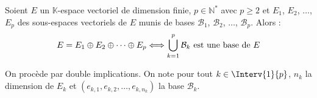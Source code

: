\documentclass[a4paper,10pt]{report}
\newcommand{\Sum}[2]{\ensuremath{\textstyle{\sum\limits_{#1}^{#2}}}}
\begin{document}
\begin{prop}\label{UnionBase} Soient $E$ un $\mathbb{K}$-espace vectoriel de dimension finie, $p \in \mathbb{N}^*$ avec $p \geq 2$ et $E_1$, $E_2$, $\ldots$, $E_p$ des sous-espaces vectoriels de $E$ munis de bases $\mathcal{B}_1$, $\mathcal{B}_2$, $\ldots$, $\mathcal{B}_p$. Alors :
$$ E= E_1 \oplus E_2 \oplus \cdots \oplus E_p \Longleftrightarrow  \bigcup_{k=1}^p \mathcal{B}_k \hbox{ est une base de } E$$
\end{prop}

\begin{preuve} On procède par double implications. On note pour tout $k \in \Interv{1}{p}$, $n_k$ la dimension de $E_k$ et $(e_{k,1}, e_{k,2}, \ldots, e_{k,n_k})$ la base $\mathcal{B}_k$.

\medskip
%
%
%
%
%
\vspace{13cm}
\end{preuve}
\end{document}
